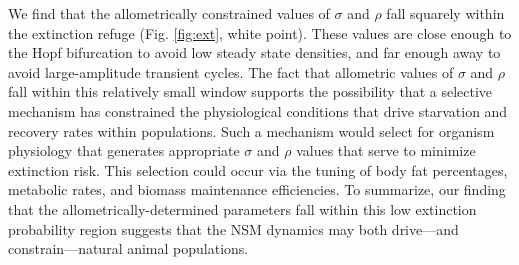 \documentclass{pnastwo}
\begin{document}
\begin{article}
We find that the allometrically constrained values of $\sigma$ and $\rho$ fall squarely within the extinction refuge (Fig. \ref{fig:ext}, white point).
These values are close enough to the Hopf bifurcation to avoid low steady state densities, and far enough away to avoid large-amplitude transient cycles.
The fact that allometric values of $\sigma$ and $\rho$ fall within this relatively small window supports the possibility that a selective mechanism has constrained the physiological conditions that drive starvation and recovery rates within populations.
Such a mechanism would select for organism physiology that generates appropriate $\sigma$ and $\rho$ values that serve to minimize extinction risk.
This selection could occur via the tuning of body fat percentages, metabolic rates, and biomass maintenance efficiencies.
To summarize, our finding that the allometrically-determined parameters fall within this low extinction probability region suggests that the NSM dynamics may both drive---and constrain---natural animal populations.\\







\end{article}
\end{document}
